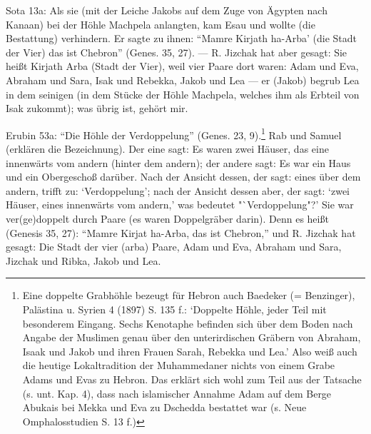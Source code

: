 \documentclass[a4paper, 11pt, oneside]{article}
\begin{document}
Sota 13a: Als sie (mit der Leiche Jakobs auf dem Zuge von Ägypten nach Kanaan) bei der Höhle Machpela anlangten, kam Esau und wollte (die Bestattung) verhindern. Er sagte zu ihnen: "`Mamre Kirjath ha-Arba' (die Stadt der Vier) das ist Chebron"' (Genes. 35, 27). --- R. Jizchak hat aber gesagt: Sie heißt Kirjath Arba (Stadt der Vier), weil vier Paare dort waren: Adam und Eva, Abraham und Sara, Isak und Rebekka, Jakob und Lea --- er (Jakob) begrub Lea in dem seinigen (in dem Stücke der Höhle Machpela, welches ihm als Erbteil von Isak zukommt); was übrig ist, gehört mir.

Erubin 53a: "`Die Höhle der Verdoppelung"' (Genes. 23, 9).\footnote{Eine doppelte Grabhöhle bezeugt für Hebron auch Baedeker (= Benzinger), Palästina u. Syrien 4 (1897) S. 135 f.: `Doppelte Höhle, jeder Teil mit besonderem Eingang. Sechs Kenotaphe befinden sich über dem Boden nach Angabe der Muslimen genau über den unterirdischen Gräbern von Abraham, Isaak und Jakob und ihren Frauen Sarah, Rebekka und Lea.' Also weiß auch die heutige Lokaltradition der Muhammedaner nichts von einem Grabe Adams und Evas zu Hebron. Das erklärt sich wohl zum Teil aus der Tatsache (s. unt. Kap. 4), dass nach islamischer Annahme Adam auf dem Berge Abukais bei Mekka und Eva zu Dschedda bestattet war (s. Neue Omphalosstudien S. 13 f.)} Rab und Samuel (erklären die Bezeichnung). Der eine sagt: Es waren zwei Häuser, das eine innenwärts vom andern (hinter dem andern); der andere sagt: Es war ein Haus und ein Obergeschoß darüber. Nach der Ansicht dessen, der sagt: eines über dem andern, trifft zu: `Verdoppelung'; nach der Ansicht dessen aber, der sagt: `zwei Häuser, eines innenwärts vom andern,' was bedeutet "`Verdoppelung"?' Sie war ver(ge)doppelt durch Paare (es waren Doppelgräber darin). Denn es heißt (Genesis 35, 27): "`Mamre Kirjat ha-Arba, das ist Chebron,"' und R. Jizchak hat gesagt: Die Stadt der vier (arba) Paare, Adam und Eva, Abraham und Sara, Jizchak und Ribka, Jakob und Lea.
\end{document}
